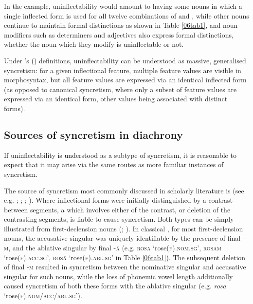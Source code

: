 \documentclass[output=paper,colorlinks,citecolor=brown]{langscibook}
\begin{document}
In the  example, uninflectability would amount to having some nouns in which a single inflected form is used for all twelve combinations of  and , while other nouns continue to maintain formal distinctions as shown in Table \ref{06tab1}, and noun modifiers such as determiners and adjectives also express formal distinctions, whether the noun which they modify is uninflectable or not.

Under \citeauthor{baermanbrowncorbett2005}'s (\citeyear{baermanbrowncorbett2005}) definitions, uninflectability can be understood as massive, generalised syncretism: for a given inflectional feature, multiple feature values are visible in morphosyntax, but all feature values are expressed via an identical inflected form (as opposed to canonical syncretism, where only a subset of feature values are expressed via an identical form, other values being associated with
distinct forms).

\subsection{Sources of syncretism in diachrony} \label{06sec2.2}

If uninflectability is understood as a subtype of syncretism, it is reasonable to expect that it may arise via the same routes as more familiar instances of syncretism.

The source of syncretism most commonly discussed in scholarly literature is  (see e.g. \citealt[190]{meiser1992}; \citealt[5]{baermanbrowncorbett2005}; \citealt[229]{baerman2008}; \citealt{esher-syncretism-nodate}). Where inflectional forms were initially distinguished by a contrast between segments, a  which involves either  of the contrast, or deletion of the contrasting segments, is liable to cause syncretism. Both types can be simply illustrated from  first-declension nouns (\citealt[5]{baermanbrowncorbett2005}; \citealt{pinkster1990,sornicola2011,esher-syncretism-nodate}). In classical , for most first-declension nouns, the accusative singular was uniquely identifiable by the presence of final -\textsc{m,} and the ablative singular by final \textsc{-ā} (e.g. \textsc{rosa} `rose(\textsc{f).nom.sg}', \textsc{rosam} `rose(\textsc{f).acc.sg}', \textsc{rosā} `rose\textsc{(f).abl.sg}' in Table \ref{06tab1}). The subsequent deletion of final -\textsc{m} resulted in syncretism between the nominative singular and accusative singular for such nouns, while the loss of phonemic vowel length additionally caused syncretism of both these forms with the ablative singular (e.g. \emph{rosa} `rose(\textsc{f).nom/acc/abl.sg}').
\end{document}
